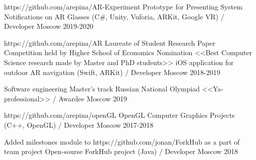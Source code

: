 


\vspace{0cm}\begin{cventries}
	
\cventry
{https://github.com/arepina/AR-Experiment
} %
{Prototype for Presenting System Notifications on AR Glasses (C\#, Unity, Vuforia, ARKit, Google VR) / Developer} %
{Moscow} %
{2019-2020} %
{}

\cventry
{https://github.com/arepina/AR
	\newline Laureate of Student Research Paper Competition held by Higher School of Economics
	\newline Nomination <<Best Computer Science research made by Master and PhD students>>
} %
{iOS application for outdoor AR navigation  (Swift, ARKit) / Developer} %
{Moscow} %
{2018-2019} %
{}

\cventry
{Software engineering Master's track} %
{Russian National Olympiad <<Ya-professional>> / Awardee} %
{Moscow} %
{2019} %
{}	
	

\cventry
{https://github.com/arepina/openGL} %
{OpenGL Computer Graphics Projects (C++, OpenGL) / Developer} %
{Moscow} %
{2017-2018} %
{}
		
	
	

\cventry
{Added milestones module to https://github.com/jonan/ForkHub as a part of team project} %
{Open-sourse ForkHub project (Java) / Developer} %
{Moscow} %
{2018} %
{}


\end{cventries}
